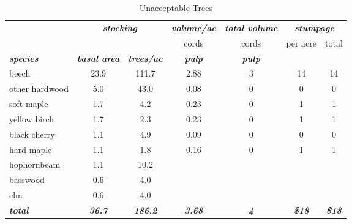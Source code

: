 \documentclass[landscape]{article}
\begin{document}
\begin{table}[H]

\caption{\label{tab:unnamed-chunk-64}Unacceptable Trees}
\fontsize{10}{12}\selectfont
\begin{tabular}[t]{lcccccc}
\toprule
\multicolumn{1}{c}{\em{\textbf{ }}} & \multicolumn{2}{c}{\em{\textbf{stocking}}} & \multicolumn{1}{c}{\em{\textbf{volume/ac }}} & \multicolumn{1}{c}{\em{\textbf{total volume}}} & \multicolumn{2}{c}{\em{\textbf{stumpage}}} \\
\cmidrule(l{3pt}r{3pt}){2-3} \cmidrule(l{3pt}r{3pt}){4-4} \cmidrule(l{3pt}r{3pt}){5-5} \cmidrule(l{3pt}r{3pt}){6-7}
\multicolumn{3}{c}{ } & \multicolumn{1}{c}{cords} & \multicolumn{1}{c}{cords} & \multicolumn{1}{c}{per acre} & \multicolumn{1}{c}{total} \\
\cmidrule(l{3pt}r{3pt}){4-4} \cmidrule(l{3pt}r{3pt}){5-5} \cmidrule(l{3pt}r{3pt}){6-6} \cmidrule(l{3pt}r{3pt}){7-7}
\rowcolor[HTML]{DCDCDC}  \em{\textbf{species}} & \em{\textbf{basal area}} & \em{\textbf{trees/ac}} & \em{\textbf{pulp}} & \em{\textbf{pulp}} & \em{\textbf{ }} & \em{\textbf{ }}\\
\midrule
\rowcolor{gray!6}  beech & 23.9 & 111.7 & 2.88 & 3 & 14 & 14\\
 
other hardwood & 5.0 & 43.0 & 0.08 & 0 & 0 & 0\\
 
\rowcolor{gray!6}  soft maple & 1.7 & 4.2 & 0.23 & 0 & 1 & 1\\
 
yellow birch & 1.7 & 2.3 & 0.23 & 0 & 1 & 1\\
 
\rowcolor{gray!6}  black cherry & 1.1 & 4.9 & 0.09 & 0 & 0 & 0\\
 
hard maple & 1.1 & 1.8 & 0.16 & 0 & 1 & 1\\
 
\rowcolor{gray!6}  hophornbeam & 1.1 & 10.2 &  &  &  & \\
 
basswood & 0.6 & 4.0 &  &  &  & \\
 
\rowcolor{gray!6}  elm & 0.6 & 4.0 &  &  &  & \\
 
\rowcolor[HTML]{DCDCDC}  \em{\textbf{total}} & \em{\textbf{36.7}} & \em{\textbf{186.2}} & \em{\textbf{3.68}} & \em{\textbf{4}} & \em{\textbf{\$18}} & \em{\textbf{\$18}}\\
\bottomrule
\end{tabular}
\end{table}
\end{document}
